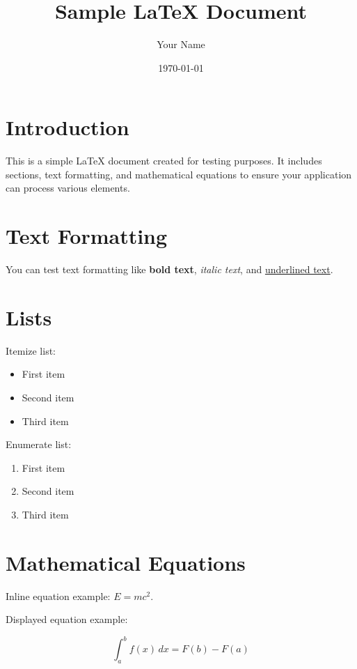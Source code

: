 \documentclass{article}
\begin{document}
\title{Sample LaTeX Document}
\author{Your Name}
\date{\today}

\maketitle

\section{Introduction}

This is a simple LaTeX document created for testing purposes. It includes sections, text formatting, and mathematical equations to ensure your application can process various elements.

\section{Text Formatting}

You can test text formatting like \textbf{bold text}, \textit{italic text}, and \underline{underlined text}.

\section{Lists}

Itemize list:

\begin{itemize}
    \item First item
    \item Second item
    \item Third item
\end{itemize}

Enumerate list:

\begin{enumerate}
    \item First item
    \item Second item
    \item Third item
\end{enumerate}

\section{Mathematical Equations}

Inline equation example: $E = mc^2$.

Displayed equation example:

\[
\int_{a}^{b} f(x) \, dx = F(b) - F(a)
\]
\end{document}
